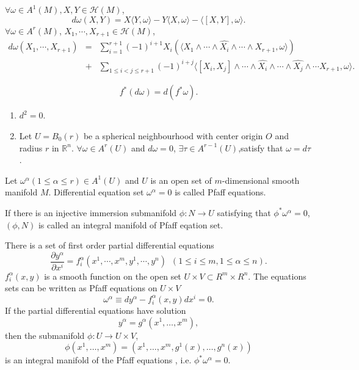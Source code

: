 \begin{newthem}
$\forall \omega \in A^1(M),X,Y \in \mathcal{H}(M)$,
\[d\omega(X,Y) = X \langle Y,\omega \rangle -Y \langle X,\omega \rangle -\langle [X,Y],\omega \rangle .\] 
$\forall \omega \in A^r(M)$, $X_1,\cdots,X_{r+1} \in \mathcal{H}(M)$,
\begin{eqnarray}
d\omega(X_1,\cdots,X_{r+1}) &=& \sum_{i=1}^{r+1}(-1)^{i+1} X_{i}(\langle X_1 \wedge \cdots \wedge \hat{X_i} \wedge \cdots \wedge X_{r+1},\omega \rangle) \nonumber \\
&+& \sum_{1 \leq i < j \leq r+1}(-1)^{i+j} \langle [X_i,X_j] \wedge \cdots \wedge \hat{X_i} \wedge \cdots \wedge \hat{X_j} \wedge \cdots X_{r+1},\omega \rangle. \nonumber
\end{eqnarray}
\end{newthem}

\begin{newthem}
\[f^{*}(d\omega) = d(f^* \omega).\]
\end{newthem}

\begin{newlemma}
\begin{enumerate}
\item $d^2=0$.
\item Let $U=B_0(r)$ be a spherical neighbourhood with center origin $O$ and radius $r$ in $\mathbb{R}^n$. $\forall \omega \in A^r(U)$ and $d\omega =0$, $\exists \tau \in A^{r-1}(U)$,satisfy that $\omega = d\tau$.
\end{enumerate}
\end{newlemma}

\begin{newdef}
Let $\omega^{\alpha}(1 \leq \alpha \leq r) \in A^1(U)$ and $U$ is an open set of $m$-dimensional smooth manifold $M$. Differential equation set $\omega^{\alpha} = 0$ is called Pfaff equations.
\end{newdef}

\begin{newdef}
If there is an injective immersion submanifold $\phi:N \to U$ satisfying that $\phi^{*} \omega^{\alpha} = 0$, $(\phi,N)$ is called an integral manifold of Pfaff eqation set.
\end{newdef}

\begin{newprop}
There is a set of first order partial differential equations
\[\frac{\partial y^{\alpha}}{\partial x^i} = f^{\alpha}_{i}(x^1,\cdots,x^{m},y^1,\cdots,y^{n}) \;\ (1 \leq i \leq m,1 \leq \alpha \leq n).\]
$f^{\alpha}_{i}(x,y)$ is a smooth function on the open set $U \times V \subset R^m \times R^n$. The equations sets can be written as Pfaff equations on $U \times V$
\[\omega^{\alpha} \equiv dy^{\alpha} - f^{\alpha}_{i}(x,y)dx^i = 0.\]
If the partial differential equations have solution
\[y^{\alpha} = g^{\alpha}(x^1,\ldots,x^m),\]
then the submanifold $\phi:U \to U \times V$,
\[\phi(x^1,\ldots,x^m) = (x^1,\ldots,x^m,g^1(x),\ldots,g^n(x)) \]
is an integral manifold of the Pfaff equations , i.e. $\phi^* \omega^{\alpha} =0$.
\end{newprop}


